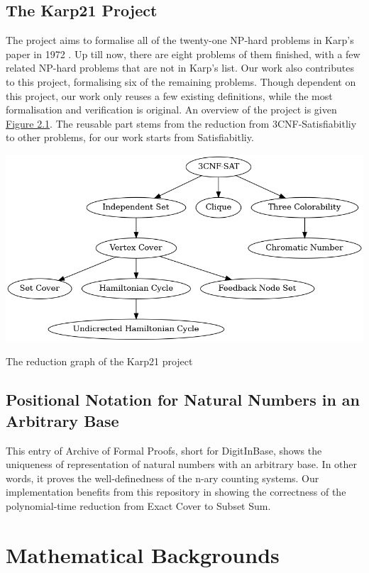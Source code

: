 \subsection*{The Karp21 Project \cite{polyred}}
The project aims to formalise all of the twenty-one NP-hard problems in Karp's paper in 1972 \cite{karp2010reducibility}. 
Up till now, there are eight problems of them finished, with a few related NP-hard problems that are not in Karp's list. 
Our work also contributes to this project, formalising six of the remaining problems. 
Though dependent on this project, our work only reuses a few existing definitions, 
while the most formalisation and verification is original. An overview of the project is given \hyperref[figure:1]{Figure 2.1}.
The reusable part stems from the reduction from 3CNF-Satisfiabitliy to other problems, for our work starts from Satisfiabitliy.
\begin{oldfigure}[h!]
\centering
\includegraphics[scale=0.4]{figures/reductions.png}
\caption{The reduction graph of the Karp21 project}
\label{figure:1}
\end{oldfigure}

\subsection*{Positional Notation for Natural Numbers in an Arbitrary Base \cite{DigitsInBase-AFP}}
This entry of Archive of Formal Proofs, short for DigitInBase, shows the uniqueness of representation of natural numbers with an arbitrary base. 
In other words, it proves the well-definedness of the n-ary counting systems. 
Our implementation benefits from this repository in showing the correctness of the polynomial-time reduction from Exact Cover to Subset Sum.

\section{Mathematical Backgrounds}
